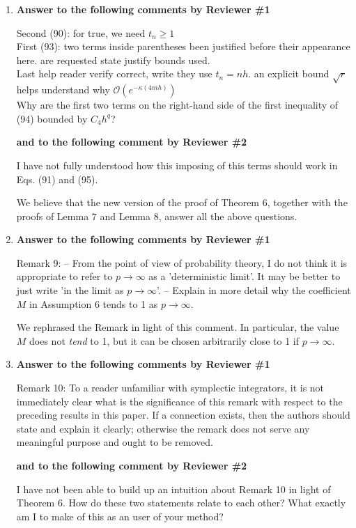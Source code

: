 \documentclass[10pt]{article}
\begin{document}
\begin{enumerate}
	\item \textbf{Answer to the following comments by Reviewer \#1}
	\begin{itquote}
		Second (90): for true, we need $t_n\geq 1$ \\ First (93): two terms inside parentheses been justified before their appearance here. are requested state justify bounds used. \\ Last help reader verify correct, write they use $t_n=nh$. an explicit bound $\sqrt{r}$ helps understand why $\mathcal O(e^{-\kappa (4mh)})$ \\ Why are the first two terms on the right-hand side of the first inequality of (94) bounded by $C_4 h^q$?
	\end{itquote}
	\textbf{and to the following comment by Reviewer \#2}
	\begin{itquote}
		I have not fully understood how this imposing of this terms should work in Eqs. (91) and (95).
	\end{itquote}
	We believe that the new version of the proof of Theorem 6, together with the proofs of Lemma 7 and Lemma 8, answer all the above questions.
	\item \textbf{Answer to the following comments by Reviewer \#1}
	\begin{itquote}
		Remark 9: -- From the point of view of probability theory, I do not think it is appropriate to refer to $p\to\infty$ as a 'deterministic limit'. It may be better to just write 'in the limit as $p\to\infty$'. -- Explain in more detail why the coefficient $M$ in Assumption 6 tends to 1 as $p\to\infty$.
	\end{itquote}
	We rephrased the Remark in light of this comment. In particular, the value $M$ does not \textit{tend} to 1, but it can be chosen arbitrarily close to 1 if $p \to \infty$.
	\item \textbf{Answer to the following comments by Reviewer \#1}
	\begin{itquote}
		Remark 10: To a reader unfamiliar with symplectic integrators, it is not immediately clear what is the significance of this remark with respect to the preceding results in this paper. If a connection exists, then the authors should state and explain it clearly; otherwise the remark does not serve any meaningful purpose and ought to be removed.
	\end{itquote}
	\textbf{and to the following comment by Reviewer \#2}
	\begin{itquote}
		I have not been able to build up an intuition about Remark 10 in light of Theorem 6. How do these two statements relate to each other? What exactly am I to make of this as an user of your method?

\end{itquote}
\end{enumerate}
\end{document}
